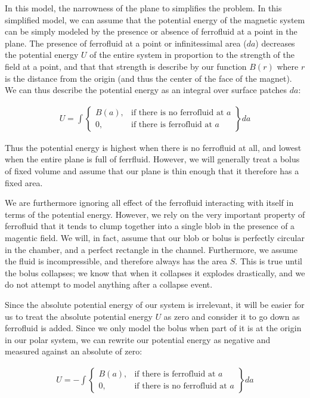 \documentclass{asme2ej}
\begin{document}
In this model,  the narrowness of the plane to simplifies
the problem. In this simplified model, we can assume
that the potential energy of the magnetic system can be simply
modeled by the presence or absence of ferrofluid at a point in the plane.
The presence of ferrofluid at a point or infinitessimal area ($da$) decreases the potential energy $U$
of the entire system in proportion to the strength of the field at a point,
and that that strength is describe by our function $B(r)$ where $r$ is the
distance from the origin (and thus the center of the face of the magnet).
We can thus describe the potential energy as an integral over surface patches $da$:

\begin{align}
  U = \int
\left\{
    \begin{array}{lr}
      B(a)  , & \text{if there is no ferrofluid at } a \\
      0 , & \text{if there is ferrofluid at } a
    \end{array}
\right\} da
\end{align}

Thus the potential energy is highest when there is no ferrofluid at all,
and lowest when the entire plane is full of ferrfluid.
However, we will generally treat a bolus of fixed volume and assume
that our plane is thin enough that it therefore has a fixed area.


We are furthermore ignoring all effect of the ferrofluid
interacting with itself in terms
of the potential energy.
However, we rely on the very important property of ferrofluid that
it tends to clump together into a single blob in the presence
of a magentic field.
We will, in fact, assume that our blob or bolus is perfectly
circular in the chamber,
and a perfect rectangle in the channel. Furthermore,
we assume the fluid is incompressible,
and therefore always has the area $S$.
This is true until the bolus collapses; we know that
when it collapses it explodes drastically,
and we do not attempt to model anything after
a collapse event.

Since the absolute potential energy of our system is irrelevant,
it will be easier for us to treat the absolute potential energy $U$
as zero and consider it to go down as ferrofluid is added.
Since we only model the bolus when part of it is at the origin
in our polar system, we can rewrite our potential energy as negative
and measured against an absolute of zero:

\begin{align}
  U = - \int
\left\{
    \begin{array}{lr}
      B(a)  , & \text{if there is ferrofluid at } a \\
      0 , & \text{if there is no ferrofluid at } a
    \end{array}
\right\} da
\end{align}
\end{document}
